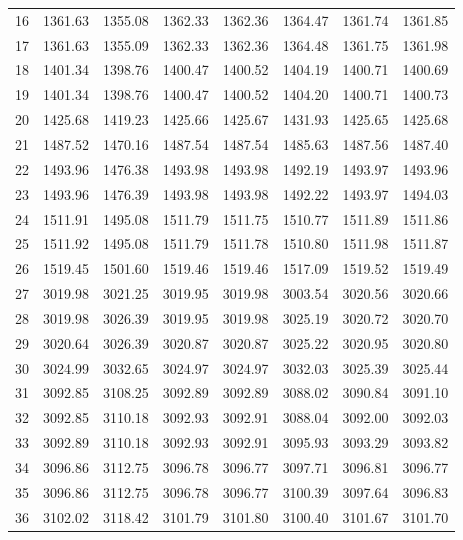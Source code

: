 \documentclass[10pt,oneside]{article}
\begin{document}
\begin{table}[h!]
\begin{tabular}{cccccccc}
16 &   1361.63 & 1355.08 & 1362.33 & 1362.36 &      1364.47 & 1361.74 & 1361.85 \\
17 &   1361.63 & 1355.09 & 1362.33 & 1362.36 &      1364.48 & 1361.75 & 1361.98 \\
18 &   1401.34 & 1398.76 & 1400.47 & 1400.52 &      1404.19 & 1400.71 & 1400.69 \\
19 &   1401.34 & 1398.76 & 1400.47 & 1400.52 &      1404.20 & 1400.71 & 1400.73 \\
20 &   1425.68 & 1419.23 & 1425.66 & 1425.67 &      1431.93 & 1425.65 & 1425.68 \\
21 &   1487.52 & 1470.16 & 1487.54 & 1487.54 &      1485.63 & 1487.56 & 1487.40 \\
22 &   1493.96 & 1476.38 & 1493.98 & 1493.98 &      1492.19 & 1493.97 & 1493.96 \\
23 &   1493.96 & 1476.39 & 1493.98 & 1493.98 &      1492.22 & 1493.97 & 1494.03 \\
24 &   1511.91 & 1495.08 & 1511.79 & 1511.75 &      1510.77 & 1511.89 & 1511.86 \\
25 &   1511.92 & 1495.08 & 1511.79 & 1511.78 &      1510.80 & 1511.98 & 1511.87 \\
26 &   1519.45 & 1501.60 & 1519.46 & 1519.46 &      1517.09 & 1519.52 & 1519.49 \\
27 &   3019.98 & 3021.25 & 3019.95 & 3019.98 &      3003.54 & 3020.56 & 3020.66 \\
28 &   3019.98 & 3026.39 & 3019.95 & 3019.98 &      3025.19 & 3020.72 & 3020.70 \\
29 &   3020.64 & 3026.39 & 3020.87 & 3020.87 &      3025.22 & 3020.95 & 3020.80 \\
30 &   3024.99 & 3032.65 & 3024.97 & 3024.97 &      3032.03 & 3025.39 & 3025.44 \\
31 &   3092.85 & 3108.25 & 3092.89 & 3092.89 &      3088.02 & 3090.84 & 3091.10 \\
32 &   3092.85 & 3110.18 & 3092.93 & 3092.91 &      3088.04 & 3092.00 & 3092.03 \\
33 &   3092.89 & 3110.18 & 3092.93 & 3092.91 &      3095.93 & 3093.29 & 3093.82 \\
34 &   3096.86 & 3112.75 & 3096.78 & 3096.77 &      3097.71 & 3096.81 & 3096.77 \\
35 &   3096.86 & 3112.75 & 3096.78 & 3096.77 &      3100.39 & 3097.64 & 3096.83 \\
36 &   3102.02 & 3118.42 & 3101.79 & 3101.80 &      3100.40 & 3101.67 & 3101.70 \\
\bottomrule
\end{tabular}
\end{table}
\end{document}
